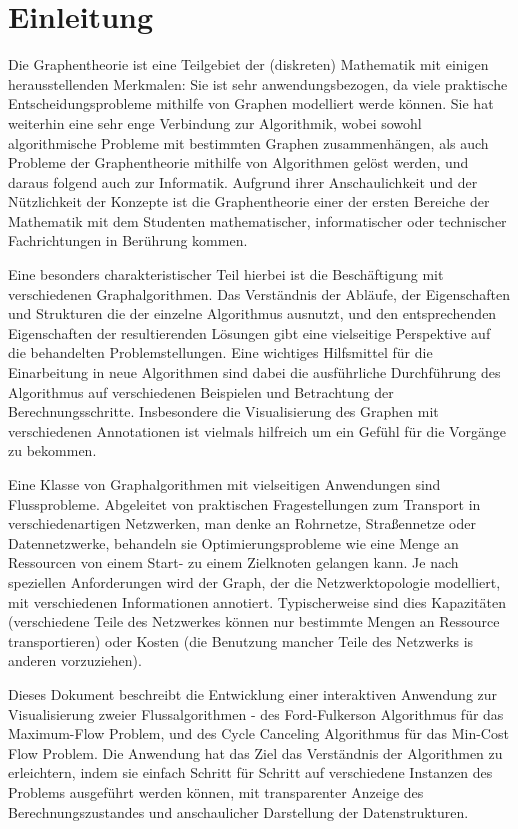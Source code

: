 \chapter*{Einleitung}

Die Graphentheorie ist eine Teilgebiet der (diskreten) Mathematik mit einigen herausstellenden Merkmalen: Sie ist sehr anwendungsbezogen, da viele praktische Entscheidungsprobleme mithilfe von Graphen modelliert werde können. Sie hat weiterhin eine sehr enge Verbindung zur Algorithmik, wobei sowohl algorithmische Probleme mit bestimmten Graphen zusammenhängen, als auch Probleme der Graphentheorie mithilfe von Algorithmen gelöst werden, und daraus folgend auch zur Informatik. Aufgrund ihrer Anschaulichkeit und der Nützlichkeit der Konzepte ist die Graphentheorie einer der ersten Bereiche der Mathematik mit dem Studenten mathematischer, informatischer oder technischer Fachrichtungen in Berührung kommen.

Eine besonders charakteristischer Teil hierbei ist die Beschäftigung mit verschiedenen Graphalgorithmen. Das Verständnis der Abläufe, der Eigenschaften und Strukturen die der einzelne Algorithmus ausnutzt, und den entsprechenden Eigenschaften der resultierenden Lösungen gibt eine vielseitige Perspektive auf die behandelten Problemstellungen. Eine wichtiges Hilfsmittel für die Einarbeitung in neue Algorithmen sind dabei die ausführliche Durchführung des Algorithmus auf verschiedenen Beispielen und Betrachtung der Berechnungsschritte. Insbesondere die Visualisierung des Graphen mit verschiedenen Annotationen ist vielmals hilfreich um ein Gefühl für die Vorgänge zu bekommen.

Eine Klasse von Graphalgorithmen mit vielseitigen Anwendungen sind Flussprobleme. Abgeleitet von praktischen Fragestellungen zum Transport in verschiedenartigen Netzwerken, man denke an Rohrnetze, Straßennetze oder Datennetzwerke, behandeln sie Optimierungsprobleme wie eine Menge an Ressourcen von einem Start- zu einem Zielknoten gelangen kann. Je nach speziellen Anforderungen wird der Graph, der die Netzwerktopologie modelliert, mit verschiedenen Informationen annotiert. Typischerweise sind dies Kapazitäten (verschiedene Teile des Netzwerkes können nur bestimmte Mengen an Ressource transportieren) oder Kosten (die Benutzung mancher Teile des Netzwerks is anderen vorzuziehen).

\pagebreak

Dieses Dokument beschreibt die Entwicklung einer interaktiven Anwendung zur Visualisierung zweier Flussalgorithmen - des Ford-Fulkerson Algorithmus für das Maximum-Flow Problem, und des Cycle Canceling Algorithmus für das Min-Cost Flow Problem. Die Anwendung hat das Ziel das Verständnis der Algorithmen zu erleichtern, indem sie einfach Schritt für Schritt auf verschiedene Instanzen des Problems ausgeführt werden können, mit transparenter Anzeige des Berechnungszustandes und anschaulicher Darstellung der Datenstrukturen. 


